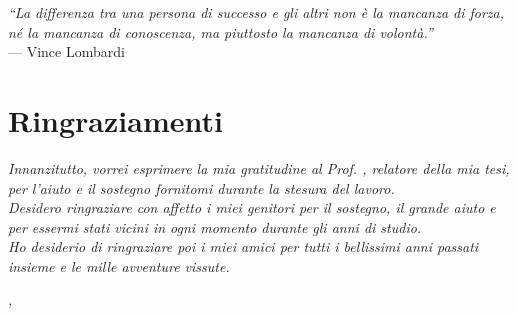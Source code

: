 \cleardoublepage
{}
{}

\begin{flushright}{
    \slshape
    ``La differenza tra una persona di successo e gli altri non è la mancanza di forza, né la mancanza di conoscenza, ma piuttosto la mancanza di volontà.''} \\
    \medskip
    --- Vince Lombardi
\end{flushright}


\bigskip

\begingroup
\let\clearpage\relax
\let\cleardoublepage\relax
\let\cleardoublepage\relax

\chapter*{Ringraziamenti}

\noindent \textit{Innanzitutto, vorrei esprimere la mia gratitudine al Prof. \myProf, relatore della mia tesi, per l'aiuto e il sostegno fornitomi durante la stesura del lavoro.}\\

\noindent \textit{Desidero ringraziare con affetto i miei genitori per il sostegno, il grande aiuto e per essermi stati vicini in ogni momento durante gli anni di studio.}\\

\noindent \textit{Ho desiderio di ringraziare poi i miei amici per tutti i bellissimi anni passati insieme e le mille avventure vissute.}\\
\bigskip

\noindent\textit{\myLocation, \myTime}
\hfill \myName

\endgroup
